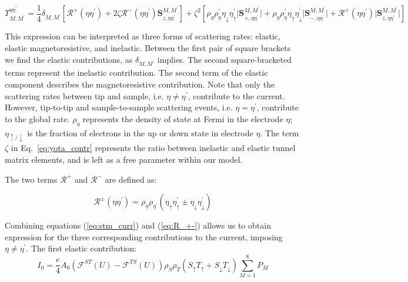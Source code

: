 \documentclass[reprint,amsmath,amssymb,aps,nofootinbib,onecolumn]{revtex4-2}
\begin{document}
\begin{equation}
\Upsilon^{\eta\eta^{\prime}}_{M,M^{\prime}}=\dfrac{1}{4}\delta_{M,M^{\prime}}\left[  \mathcal{R}^{+}(\eta\eta^{\prime})+ 2\zeta \mathcal{R}^{-}(\eta\eta^{\prime})\textbf{S}_{z,\eta\eta^{\prime}}^{M,M^{\prime}}  \right] + \zeta^{2}\left[ \rho_\eta \rho_\eta^{\prime} \eta_{\downarrow}\eta^{\prime}_{\uparrow} \lvert \textbf{S}_{+,\eta\eta^{\prime}}^{M,M^{\prime}}\rvert + \rho_\eta \rho_\eta^{\prime} \eta_{\uparrow}\eta^{\prime}_{\downarrow} \lvert {\textbf{S}_{-,\eta\eta^{\prime}}^{M,M^{\prime}}}\rvert +\mathcal{R}^{+}(\eta\eta^{\prime}) \lvert \textbf{S}_{z,\eta\eta^{\prime}}^{M,M^{\prime}}\rvert \right]
\label{eq:yota_contr} 
\end{equation}

This expression can be interpreted as three forms of scattering rates: elastic, elastic magnetoresistive, and inelastic. Between the first pair of square brackets we find the elastic contributions, as $\delta_{M,M^{\prime}}$ implies. The second square-bracketed terms represent the inelastic contribution.
The second term of the elastic component describes the magnetoresistive contribution. Note that only the scattering rates between tip and sample, i.e. $\eta\neq\eta^{\prime}$, contribute to the current. However, tip-to-tip and sample-to-sample scattering events, i.e. $\eta=\eta^{\prime}$, contribute to the global  rate. $\rho_{\eta}$ represents the density of state at Fermi in the electrode $\eta$; $\eta_{\uparrow / \downarrow}$ is the fraction of electrons in the up or down state in electrode $\eta$. The term $\zeta$ in Eq.~\ref{eq:yota_contr} represents the ratio between inelastic and elastic tunnel matrix elements, and is left as a free parameter within our model. 

The two terms $\mathcal{R}^{+}$ and $\mathcal{R}^{-}$ are defined as:

\begin{equation}
\mathcal{R}^{\pm}(\eta\eta^{\prime})=\rho_\eta\rho_{\eta^{\prime}}\left( \eta_{\uparrow}\eta^{\prime}_{\uparrow} \pm \eta_{\downarrow}\eta^{\prime}_{\downarrow} \right)
\label{eq:R_+-}
\end{equation}

Combining equations (\ref{eq:stm_curr}) and (\ref{eq:R_+-}) allows us to obtain expression for the three corresponding contributions to the current, imposing $\eta \neq \eta^{\prime} $.
The first elastic contribution:
\begin{equation}
I_0=\dfrac{e}{4} A_0 \left( \mathcal{F}^{ST}(U)-\mathcal{F}^{TS}(U) \right)\rho_S\rho_T \left( S_{\uparrow}T_{\uparrow} + S_{\downarrow}T_{\downarrow} \right) \sum^{8}_{M=1}P_M
\label{eq:I_0}
\end{equation}
\end{document}
